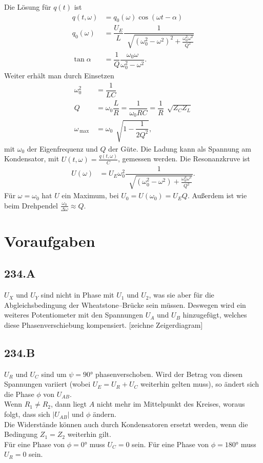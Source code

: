 \documentclass[a4paper,12pt]{article}
\numberwithin{equation}{section}
\begin{document}
Die Lösung für $q\left(t\right)$ ist
\begin{align} 
        q\left(t,\omega \right)&=q_0\left(\omega \right)\cos \left(\omega t-\alpha \right)\\
        q_0\left(\omega \right)&=\dfrac{U_E}{L}\dfrac{1}{\,\sqrt[]{\left(\omega _0^2-\omega ^2\right)^2+\tfrac{\omega _0^2\omega ^2}{Q^2} }}\\
        \tan \alpha &=\dfrac{1}{Q}\dfrac{\omega _0\omega }{\omega _0^2-\omega ^2}
.\end{align} 
Weiter erhält man durch Einsetzen
\begin{align} 
        \omega _0^2&=\dfrac{1}{LC}\\
        Q&=\omega _0\dfrac{L}{R}=\dfrac{1}{\omega _0RC}=\dfrac{1}{R}\,\sqrt[]{Z_CZ_L}\\
        \omega _{\,\text{max}\,}&=\omega _0\,\sqrt[]{1-\dfrac{1}{2Q^2}}
,\end{align} 
mit $\omega _0$ der Eigenfrequenz und $Q$ der Güte. Die Ladung kann als Spannung am Kondensator, mit $U\left(t,\omega \right)=\tfrac{q\left(t,\omega \right)}{C}$, gemessen werden. Die Resonanzkruve ist
\begin{align} 
        U\left(\omega \right)&=U_E\omega _0^2\dfrac{1}{\,\sqrt[]{\left(\omega _0^2-\omega ^2\right)+\tfrac{\omega _0^2\omega ^2}{Q^2}}}
.\end{align} 
Für $\omega =\omega _0$ hat $U$ ein Maximum, bei $U_0=U\left(\omega _0\right)=U_EQ$. Außerdem ist wie beim Drehpendel $\tfrac{\omega _0}{\Delta \omega }\approx Q$.


\newpage
\section{Voraufgaben}
\subsection{234.A}
$U_X$ und $U_Y$ sind nicht in Phase mit $U_1$ und $U_2$, was sie aber für die Abgleichsbedingung der Wheatstone--Brücke sein müssen. Deswegen wird ein weiteres Potentiometer mit den Spannungen $U_A$ und $U_B$ hinzugefügt, welches diese Phasenverschiebung kompensiert. [zeichne Zeigerdiagram]

\subsection{234.B}
$U_R$ und $U_C$ sind um $\psi =\ang{90}$ phasenverschoben. Wird der Betrag von diesen Spannungen variiert (wobei $U_E=U_R+U_C$ weiterhin gelten muss), so ändert sich die Phase $\phi $ von $U_{AB}$.\\\indent
Wenn $R_1\neq R_2$, dann liegt $A$ nicht mehr im Mittelpunkt des Kreises, woraus folgt, dass sich $|U_{AB}|$ und $\phi $ ändern.\\\indent
Die Widerstände können auch durch Kondensatoren ersetzt werden, wenn die Bedingung $Z_1=Z_2$ weiterhin gilt.\\\indent
Für eine Phase von $\phi =\ang{0}$ muss $U_C=0$ sein. Für eine Phase von $\phi =\ang{180}$ muss $U_R=0$ sein.\\
\end{document}
